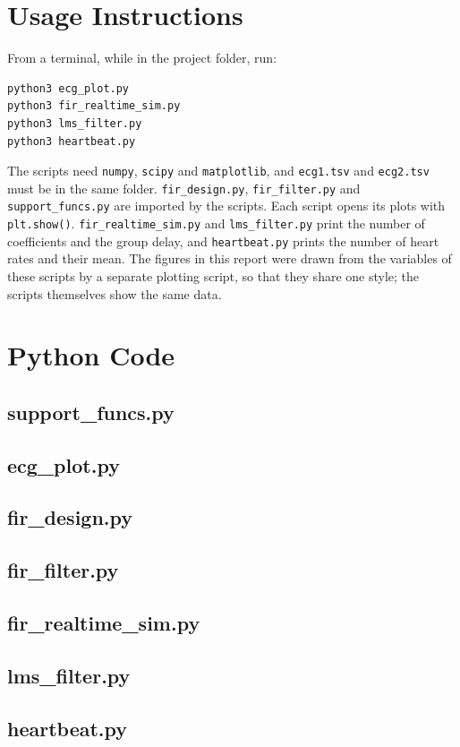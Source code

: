 \documentclass[11pt,a4paper]{article}
\begin{document}
\section{Usage Instructions}
From a terminal, while in the project folder, run:
\begin{verbatim}
python3 ecg_plot.py
python3 fir_realtime_sim.py
python3 lms_filter.py
python3 heartbeat.py
\end{verbatim}
The scripts need \texttt{numpy}, \texttt{scipy} and \texttt{matplotlib}, and \texttt{ecg1.tsv} and \texttt{ecg2.tsv} must be in the same folder.
\texttt{fir\_design.py}, \texttt{fir\_filter.py} and \texttt{support\_funcs.py} are imported by the scripts.
Each script opens its plots with \texttt{plt.show()}.
\texttt{fir\_realtime\_sim.py} and \texttt{lms\_filter.py} print the number of coefficients and the group delay, and \texttt{heartbeat.py} prints the number of heart rates and their mean.
The figures in this report were drawn from the variables of these scripts by a separate plotting script, so that they share one style; the scripts themselves show the same data.

\section{Python Code}

\subsection{support\_funcs.py}


\subsection{ecg\_plot.py}


\subsection{fir\_design.py}


\subsection{fir\_filter.py}


\subsection{fir\_realtime\_sim.py}


\subsection{lms\_filter.py}


\subsection{heartbeat.py}

\end{document}
